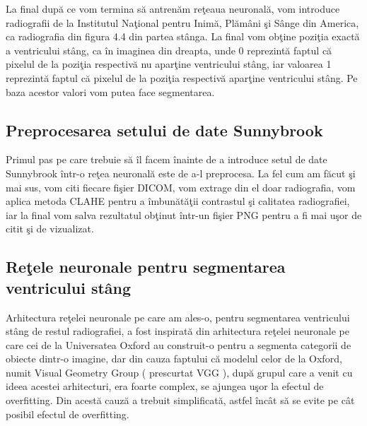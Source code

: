 \par

La final dup\u{a} ce vom termina s\u{a} antren\u{a}m re\c{t}eaua neuronal\u{a}, vom introduce radiografii de la Institutul Na\c{t}ional pentru Inim\u{a}, Pl\u{a}m\^{a}ni \c{s}i S\^{a}nge din America, ca radiografia din figura 4.4 din partea st\^{a}nga. La final vom ob\c{t}ine pozi\c{t}ia exact\u{a} a ventricului st\^{a}ng, ca \^{i}n imaginea din dreapta, unde 0 reprezint\u{a} faptul c\u{a} pixelul de la pozi\c{t}ia respectiv\u{a} nu apar\c{t}ine ventricului st\^{a}ng, iar valoarea 1 reprezint\u{a} faptul c\u{a} pixelul de la pozi\c{t}ia respectiv\u{a} apar\c{t}ine ventricului st\^{a}ng. Pe baza acestor valori vom putea face segmentarea.

\subsection{Preprocesarea setului de date Sunnybrook}

Primul pas pe care trebuie s\u{a} \^{i}l facem \^{i}nainte de a introduce setul de date Sunnybrook \^{i}ntr-o re\c{t}ea neuronal\u{a} este de a-l preprocesa. La fel cum am f\u{a}cut \c{s}i mai sus, vom citi fiecare fi\c{s}ier DICOM, vom extrage din el doar radiografia, vom aplica metoda CLAHE pentru a \^{i}mbun\u{a}t\u{a}\c{t}ii contrastul \c{s}i calitatea radiografiei, iar la final vom salva rezultatul ob\c{t}inut \^{i}ntr-un fi\c{s}ier PNG pentru a fi mai u\c{s}or de citit \c{s}i de vizualizat.

\subsection{Re\c{t}ele neuronale pentru segmentarea ventricului st\^{a}ng}

Arhitectura re\c{t}elei neuronale pe care am ales-o, pentru segmentarea ventricului st\^{a}ng de restul radiografiei, a fost inspirat\u{a} din arhitectura re\c{t}elei neuronale pe care cei de la Universatea Oxford au construit-o pentru a segmenta categorii de obiecte dintr-o imagine, dar din cauza faptului c\u{a} modelul celor de la Oxford, numit Visual Geometry Group ( prescurtat VGG ), dup\u{a} grupul care a venit cu ideea acestei arhitecturi, era foarte complex, se ajungea u\c{s}or la efectul de overfitting. Din acest\u{a} cauz\u{a} a trebuit simplificat\u{a}, astfel \^{i}nc\^{a}t s\u{a} se evite pe c\^{a}t posibil efectul de overfitting.

\par


